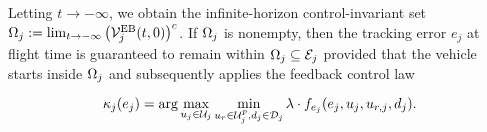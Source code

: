 Letting $t \to -\infty$, we obtain the infinite-horizon control-invariant set $\Omega_j := \lim_{t \to -\infty} \left( \mathcal{V}^{\text{EB}}_{j}(t, 0) \right)^c$. If $\Omega_j$ is nonempty, then the tracking error $e_j$ at flight time is guaranteed to remain within $\Omega_j \subseteq \mathcal{E}_j$ provided that the vehicle starts inside $\Omega_j$ and subsequently applies the feedback control law

\begin{equation}
\label{eq:robust_tracking_law}
\tracklaw_j(e_j) = \arg\max_{\ctrl_j \in \cset_j} \min_{\ctrl_r \in\cset^\pos_j, \dstb_j \in \dset_j} \costate \cdot \fdyn_{e_j}(e_j,\ctrl_j,\ctrl_{r, j},\dstb_j).
\end{equation}

%
%
